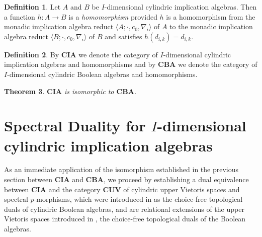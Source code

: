 \documentclass[reqno]{amsart}
\theoremstyle{plain}
\newtheorem{theorem}{Theorem}[section]
\theoremstyle{definition}
\newtheorem{definition}[theorem]{Definition}
\begin{document}
\begin{definition}
    Let $A$ and $B$ be $I$-dimensional cylindric implication algebras. Then a function $h\colon A\to B$ is a \emph{homomorphism} provided $h$ is a homomorphism from the monadic implication algebra reduct $\langle A;\cdot,c_0,\nabla_i\rangle$ of $A$ to the monadic implication algebra reduct $\langle B;\cdot,c_0,\nabla_i\rangle$ of $B$ and satisfies $h(d_{i,k})=d_{i,k}$.  
\end{definition}
\begin{definition}
    By $\mathbf{CIA}$ we denote the category of $I$-dimensional cylindric implication algebras and homomorphisms and by $\mathbf{CBA}$ we denote the category of $I$-dimensional cylindric Boolean algebras and homomorphisms. 
 \end{definition}
\begin{theorem}\label{theorem 3.28}
    $\mathbf{CIA}$ is isomorphic to $\mathbf{CBA}$. 
\end{theorem}
\section{Spectral Duality for $I$-dimensional cylindric implication algebras}
As an immediate application of the isomorphism established in the previous section between $\mathbf{CIA}$ and $\mathbf{CBA}$, we proceed by establishing a dual equivalence between $\mathbf{CIA}$  and the category $\mathbf{CUV}$ of cylindric upper Vietoris spaces and spectral $p$-morphisms, which were introduced in \cite{mcdonald2} as the choice-free topological duals of cylindric Boolean algebras, and are relational extensions of the upper Vietoris spaces introduced in \cite{bez}, the choice-free topological duals of the Boolean algebras.
\end{document}
